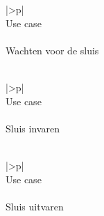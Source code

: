 	
	
	\begin{center}
		\begin{tabular}{|>\C p{}|}
			\hline
			~\\
			Use case\\
			~\\
			Wachten voor de sluis\\
			~\\
			\hline
		\end{tabular}
	\end{center}
	
	
	
	
	\begin{center}
		\begin{tabular}{|>\C p{}|}
			\hline
			~\\
			Use case\\
			~\\
			Sluis invaren\\
			~\\
			\hline
		\end{tabular}
	\end{center}
	
	
	
	
	
	\begin{center}
		\begin{tabular}{|>\C p{}|}
			\hline
			~\\
			Use case\\
			~\\
			Sluis uitvaren\\
			~\\
			\hline
		\end{tabular}
	\end{center}
	
	\begin{center}
		
	\end{center}
	
	\begin{center}
		
	\end{center}
	
	\begin{center}
		
	\end{center}
	
